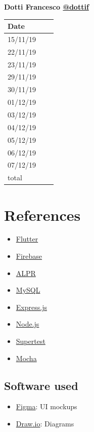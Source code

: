 \documentclass{article}
\begin{document}
	\begin{center}
		{\bf Dotti Francesco \href{https://github.com/dottif}{@dottif} }
		\vspace{2mm}

			\begin{tabular}{p{1.3cm}|p{1.8cm}|p{6.7cm}}
				\hline
				\bf Date & \bf \makebox[1.8cm][c]{Hours} & \bf \makebox[6.7cm][c]{Description} \\
				\hline
				15/11/19 & \makebox[1.8cm][c]{1} & \makebox[6.7cm][c]{Initial Structure}\\
				22/11/19 & \makebox[1.8cm][c]{1.5} & \makebox[6.7cm][c]{Introduction}\\
				23/11/19 & \makebox[1.8cm][c]{1.5} & \makebox[6.7cm][c]{Architectural design}\\
				29/11/19 & \makebox[1.8cm][c]{0.5} & \makebox[6.7cm][c]{Component view}\\
				30/11/19 & \makebox[1.8cm][c]{6.5}\makebox[6.7cm][c]{Component Deployment Runtime view}\\
				01/12/19 & \makebox[1.8cm][c]{8} & \makebox[6.7cm][c]{Architectural design}\\
				03/12/19 & \makebox[1.8cm][c]{0.5} & \makebox[6.7cm][c]{Architectural design}\\
				04/12/19 & \makebox[1.8cm][c]{2.5} & \makebox[6.7cm][c]{Architectural design}\\
				05/12/19 & \makebox[1.8cm][c]{4} & \makebox[6.7cm][c]{Req. traceability and Implementation}\\
				06/12/19 & \makebox[1.8cm][c]{3} & \makebox[6.7cm][c]{Implementation and Testing}\\
				07/12/19 & \makebox[1.8cm][c]{2} & \makebox[6.7cm][c]{Integration and Testing}\\
				\hline
				total    & \makebox[1.8cm][c]{31}
			\end{tabular}
	\end{center}
\newpage
\section{References}
\begin{itemize}
	\item \href{https://flutter.dev/}{Flutter}
	\item \href{https://firebase.google.com/}{Firebase}
	\item \href{https://www.openalpr.com/}{ALPR}
	\item \href{https://www.mysql.com/}{MySQL}
	\item \href{https://expressjs.com/}{Express.js}
	\item \href{https://nodejs.org/en/}{Node.js}
	\item \href{https://www.npmjs.com/package/supertest}{Supertest}
	\item \href{https://mochajs.org/}{Mocha}
\end{itemize}
\subsection{Software used}
\begin{itemize}
	\item \href{https://www.figma.com/}{Figma}: UI mockups
	\item \href{https://www.draw.io/}{Draw.io}: Diagrams
\end{itemize} 
\end{document}
